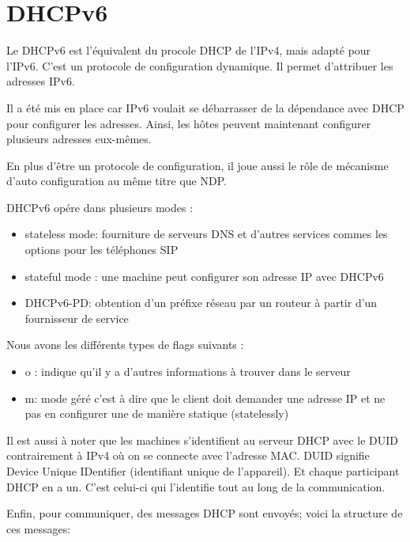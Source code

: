 \section{DHCPv6}

Le DHCPv6 est l’équivalent du procole DHCP de l'IPv4, mais adapté pour l'IPv6.
C’est un protocole de configuration dynamique.
Il permet d’attribuer les adresses IPv6. 

Il a été mis en place car IPv6 voulait se débarrasser de la dépendance avec DHCP pour configurer les adresses. 
Ainsi, les hôtes peuvent maintenant configurer plusieurs adresses eux-mêmes. 

En plus d’être un protocole de configuration, il joue aussi le rôle de mécanisme d’auto configuration au même titre que NDP. 

DHCPv6 opére dans plusieurs modes :
\begin{itemize}
  \item stateless mode: fourniture de serveurs DNS et d’autres services commes les options pour les téléphones SIP
  \item stateful mode : une machine peut configurer son adresse IP avec DHCPv6
  \item DHCPv6-PD: obtention d’un préfixe réseau par un routeur à partir d’un fournisseur de service
\end{itemize}


Nous avons les différents types de flags suivants : 
\begin{itemize}
  \item o : indique qu’il y a d’autres informations à trouver dans le serveur 
  \item m: mode géré c’est à dire que le client doit demander une adresse IP et ne pas en configurer une de manière statique (statelessly)
\end{itemize}

Il est aussi à noter que les machines s’identifient au serveur DHCP avec le DUID contrairement à IPv4 où on se connecte avec l’adresse MAC. 
DUID signifie Device Unique IDentifier (identifiant unique de l’appareil). Et chaque participant DHCP en a un. C’est celui-ci qui l’identifie tout au long de la communication.

Enfin, pour communiquer, des messages DHCP sont envoyés; voici  la structure de ces messages: 


